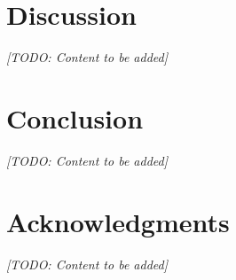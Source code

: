 \documentclass[11pt]{article}
\begin{document}


\section{Discussion}
\textit{[TODO: Content to be added]}

\section{Conclusion}
\textit{[TODO: Content to be added]}

\section{Acknowledgments}
\textit{[TODO: Content to be added]}



\end{document}
